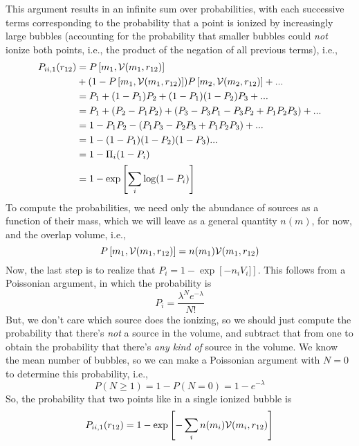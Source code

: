 This argument results in an infinite sum over probabilities, with each successive terms corresponding to the probability that a point is ionized by increasingly large bubbles (accounting for the probability that smaller bubbles could \textit{not} ionize both points, i.e., the product of the negation of all previous terms), i.e.,
\begin{align}
    P_{ii,1} (r_{12}) & = P\left[m_1,\mathcal{V}(m_1,r_{12})\right] \nonumber \\
    & + (1 - P\left[m_1,\mathcal{V}(m_1,r_{12})\right]) P\left[m_2,\mathcal{V}(m_2,r_{12})\right] + ... \nonumber \\
    & = P_1 + (1 - P_1) P_2 + (1 - P_1)(1 - P_2) P_3 + ... \nonumber \\
    & = P_1 + (P_2 - P_1 P_2) + (P_3 - P_3 P_1 - P_3 P_2 + P_1 P_2 P_3) + ... \nonumber \\
    & = 1 - P_1 P_2 - (P_1 P_3 - P_2 P_3 + P_1 P_2 P_3) + ... \nonumber \\
    & = 1 - (1 - P_1) (1  - P_2) (1 - P_3) ... \nonumber  \\
    & = 1 - \Pi_i (1 - P_i) \nonumber \\
    & = 1 - \exp \left[ \sum_i \log(1 - P_i) \right]
\end{align}
To compute the probabilities, we need only the abundance of sources as a function of their mass, which we will leave as a general quantity $n(m)$, for now, and the overlap volume, i.e.,
\begin{equation}
    P\left[m_1,\mathcal{V}(m_1,r_{12})\right] = n(m_1) \mathcal{V}(m_1,r_{12})
\end{equation}
Now, the last step is to realize that $P_i = 1 - \exp\left[-n_i V_i] \right]$. This follows from a Poissonian argument, in which the probability is
\begin{equation}
    P_i = \frac{\lambda^N e^{-\lambda}}{N!}
\end{equation}
But, we don't care which source does the ionizing, so we should just compute the probability that there's \textit{not} a source in the volume, and subtract that from one to obtain the probability that there's \textit{any kind of} source in the volume. We know the mean number of bubbles, so we can make a Poissonian argument with $N=0$ to determine this probability, i.e.,
\begin{equation}
    P(N \geq 1) = 1 - P(N = 0) = 1 - e^{-\lambda} \label{eq:P1src}
\end{equation}
So, the probability that two points like in a single ionized bubble is
\begin{equation}
    P_{ii,1} (r_{12}) = 1 - \exp \left[ -\sum_i n(m_i) \mathcal{V}(m_i,r_{12}) \right]
\end{equation}
